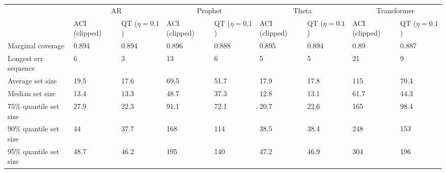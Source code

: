 \begin{tabular}{lllllllll}
\toprule
& \multicolumn{2}{c}{AR}& \multicolumn{2}{c}{Prophet}& \multicolumn{2}{c}{Theta}& \multicolumn{2}{c}{Transformer} \\
& ACI (clipped) & QT ($\eta=0.1$) & ACI (clipped) & QT ($\eta=0.1$) & ACI (clipped) & QT ($\eta=0.1$) & ACI (clipped) & QT ($\eta=0.1$) \\
\midrule
Marginal coverage & 0.894 & 0.894 & 0.896 & 0.888 & 0.895 & 0.894 & 0.89 & 0.887 \\
Longest err sequence & 6 & 3 & 13 & 6 & 5 & 5 & 21 & 9 \\
Average set size & 19.5 & 17.6 & 69.5 & 51.7 & 17.9 & 17.8 & 115 & 70.4 \\
Median set size & 13.4 & 13.3 & 48.7 & 37.3 & 12.8 & 13.1 & 61.7 & 44.3 \\
75\% quantile set size & 27.9 & 22.3 & 91.1 & 72.1 & 20.7 & 22.6 & 165 & 98.4 \\
90\% quantile set size & 44 & 37.7 & 168 & 114 & 38.5 & 38.4 & 248 & 153 \\
95\% quantile set size & 48.7 & 46.2 & 195 & 140 & 47.2 & 46.9 & 304 & 196 \\
\bottomrule
\end{tabular}
